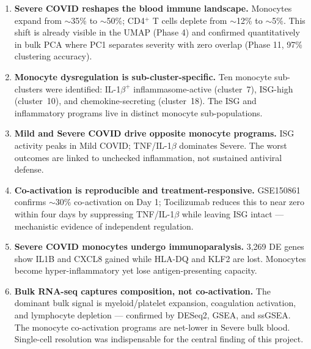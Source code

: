 \documentclass[11pt, a4paper]{article}
\begin{document}
\begin{enumerate}[nosep]
  \item \textbf{Severe COVID reshapes the blood immune landscape.}
        Monocytes expand from $\sim$35\% to $\sim$50\%; CD4$^+$ T cells deplete from
        $\sim$12\% to $\sim$5\%. This shift is already visible in the UMAP (Phase 4)
        and confirmed quantitatively in bulk PCA where PC1 separates severity with
        zero overlap (Phase 11, 97\% clustering accuracy).

  \item \textbf{Monocyte dysregulation is sub-cluster-specific.}
        Ten monocyte sub-clusters were identified: IL-1$\beta^+$ inflammasome-active
        (cluster~7), ISG-high (cluster~10), and chemokine-secreting (cluster~18).
        The ISG and inflammatory programs live in distinct monocyte sub-populations.

  \item \textbf{Mild and Severe COVID drive opposite monocyte programs.}
        ISG activity peaks in Mild COVID; TNF/IL-1$\beta$ dominates Severe.
        The worst outcomes are linked to unchecked inflammation, not sustained antiviral defense.

  \item \textbf{Co-activation is reproducible and treatment-responsive.}
        GSE150861 confirms $\sim$30\% co-activation on Day 1; Tocilizumab reduces this to
        near zero within four days by suppressing TNF/IL-1$\beta$ while leaving ISG
        intact — mechanistic evidence of independent regulation.

  \item \textbf{Severe COVID monocytes undergo immunoparalysis.}
        3,269 DE genes show IL1B and CXCL8 gained while HLA-DQ and KLF2 are lost.
        Monocytes become hyper-inflammatory yet lose antigen-presenting capacity.

  \item \textbf{Bulk RNA-seq captures composition, not co-activation.}
        The dominant bulk signal is myeloid/platelet expansion, coagulation activation,
        and lymphocyte depletion — confirmed by DESeq2, GSEA, and ssGSEA.
        The monocyte co-activation programs are net-lower in Severe bulk blood.
        Single-cell resolution was indispensable for the central finding of this project.
\end{enumerate}
\end{document}
